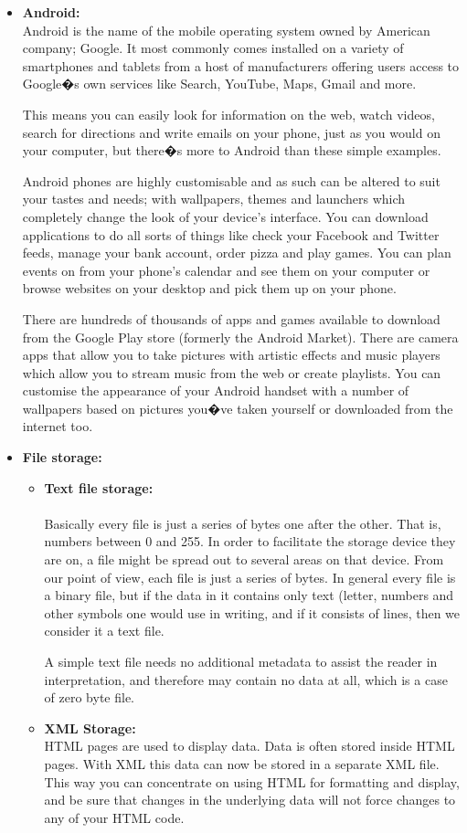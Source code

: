 \documentclass[a4paper,12pt]{article}
\begin{document}
\begin{itemize}
\item \textbf{Android:}\\
Android is the name of the mobile operating system owned by American company; Google. It most commonly comes installed on a variety of smartphones and tablets from a host of manufacturers offering users access to Google�s own services like Search, YouTube, Maps, Gmail and more.

This means you can easily look for information on the web, watch videos, search for directions and write emails on your phone, just as you would on your computer, but there�s more to Android than these simple examples.

Android phones are highly customisable and as such can be altered to suit your tastes and needs; with wallpapers, themes and launchers which completely change the look of your device's interface. You can download applications to do all sorts of things like check your Facebook and Twitter feeds, manage your bank account, order pizza and play games. You can plan events on from your phone's calendar and see them on your computer or browse websites on your desktop and pick them up on your phone.

There are hundreds of thousands of apps and games available to download from the Google Play store (formerly the Android Market). There are camera apps that allow you to take pictures with artistic effects and music players which allow you to stream music from the web or create playlists. You can customise the appearance of your Android handset with a number of wallpapers based on pictures you�ve taken yourself or downloaded from the internet too.
\item \textbf{File storage:}
	\begin{itemize}
   \item \textbf{Text file storage:}\\\\
Basically every file is just a series of bytes one after the other. That is, numbers between 0 and 255. In order to facilitate the storage device they are on, a file might be spread out to several areas on that device. From our point of view, each file is just a series of bytes. In general every file is a binary file, but if the data in it contains only text (letter, numbers and other symbols one would use in writing, and if it consists of lines, then we consider it a text file.

A simple text file needs no additional metadata to assist the reader in interpretation, and therefore may contain no data at all, which is a case of zero byte file.\\
	\item \textbf{XML Storage:}\\
HTML pages are used to display data. Data is often stored inside HTML pages. With XML this data can now be stored in a separate XML file. This way you can concentrate on using HTML for formatting and display, and be sure that changes in the underlying data will not force changes to any of your HTML code.


\end{itemize}
\end{itemize}
\end{document}
